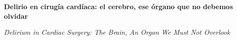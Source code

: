 \documentclass{article}
\renewcommand{\normalsize}{\fontsize{10pt}{14pt}\selectfont}
\newcommand{\articulotipo}{}
\newcommand{\articulotitulo}{}
\newcommand{\articulotitulotrans}{}
\newcommand{\articuloautores}{}
\newcommand{\articulodoi}{}
\newcommand{\articuloidiomaxml}{es}
\newcommand{\articulorevista}{}
\newcommand{\articuloissne}{}
\newcommand{\articulovolumen}{}
\newcommand{\articulonumero}{}
\newcommand{\articulofecha}{}
\newcommand{\articulopagina}{0}
\begin{document}

\renewcommand{\articuloidiomaxml}{es}
\renewcommand{\articulotitulo}{Delirio en cirugía cardíaca: el cerebro, ese órgano que no debemos olvidar}
\renewcommand{\articuloautores}{Julio Giorgini}
\renewcommand{\articulodoi}{10.7775/rac.es.v93.i6.20963}
\renewcommand{\articulotipo}{EDITORIAL}
\renewcommand{\articulorevista}{Revista Argentina de Cardiología}
\renewcommand{\articuloissne}{0034-7000}
\renewcommand{\articulovolumen}{93}
\renewcommand{\articulonumero}{6}
\renewcommand{\articulofecha}{DICIEMBRE 2025}
\renewcommand{\articulopagina}{415}

\setcounter{page}{415}
\thispagestyle{firstpage}

\noindent\begin{minipage}[t]{\dimexpr\textwidth+\marginparsep+\marginparwidth\relax}%
{\sffamily\bfseries\Large\articulotitulo\par}%
\end{minipage}\par
\vspace{3mm}%
\renewcommand{\articulotitulotrans}{Delirium in Cardiac Surgery: The Brain, An Organ We Must Not Overlook}
\noindent\begin{minipage}[t]{\dimexpr\textwidth+\marginparsep+\marginparwidth\relax}%
{\sffamily\itshape\normalsize\articulotitulotrans\par}%
\end{minipage}\par
\vspace{4mm}%
\end{document}
